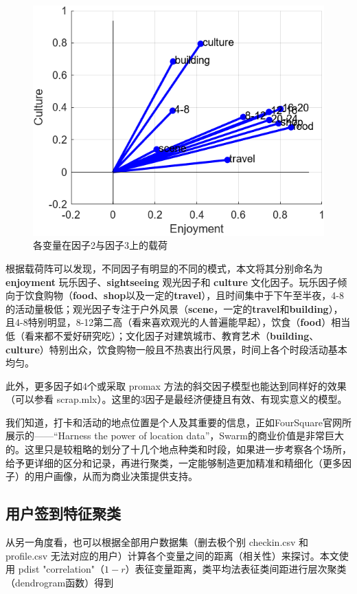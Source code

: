 \documentclass[UTF8]{ctexart}
\begin{document}
		\begin{figure}[H]
			\centering
			\includegraphics{fac3_c&e.png}
			\caption{各变量在因子2与因子3上的载荷}
			\label{fac_ce}
		\end{figure}
		
		根据载荷阵可以发现，不同因子有明显的不同的模式，本文将其分别命名为 \textbf{enjoyment} 玩乐因子、\textbf{sightseeing} 观光因子和 \textbf{culture} 文化因子。玩乐因子倾向于饮食购物（\textbf{food}、\textbf{shop}以及一定的\textbf{travel}），且时间集中于下午至半夜，4-8 的活动量极低；观光因子专注于户外风景（\textbf{scene}，一定的\textbf{travel}和\textbf{building}），且4-8特别明显，8-12第二高（看来喜欢观光的人普遍能早起），饮食（\textbf{food}）相当低（看来都不爱好研究吃）；文化因子对建筑城市、教育艺术（\textbf{building}、\textbf{culture}）特别出众，饮食购物一般且不热衷出行风景，时间上各个时段活动基本均匀。
		
		此外，更多因子如4个或采取 promax 方法的斜交因子模型也能达到同样好的效果（可以参看 scrap.mlx）。这里的3因子是最经济便捷且有效、有现实意义的模型。
		
		我们知道，打卡和活动的地点位置是个人及其重要的信息，正如FourSquare官网所展示的——``Harness the power of location data”，Swarm的商业价值是非常巨大的。这里只是较粗略的划分了十几个地点种类和时段，如果进一步考察各个场所，给予更详细的区分和记录，再进行聚类，一定能够制造更加精准和精细化（更多因子）的用户画像，从而为商业决策提供支持。
		
		\subsection{用户签到特征聚类}
		从另一角度看，也可以根据全部用户数据集（删去极个别 checkin.csv 和 profile.csv 无法对应的用户）计算各个变量之间的距离（相关性）来探讨。本文使用 pdist "correlation"（$1-r$）表征变量距离，类平均法表征类间距进行层次聚类（dendrogram函数）得到
		
\end{document}
